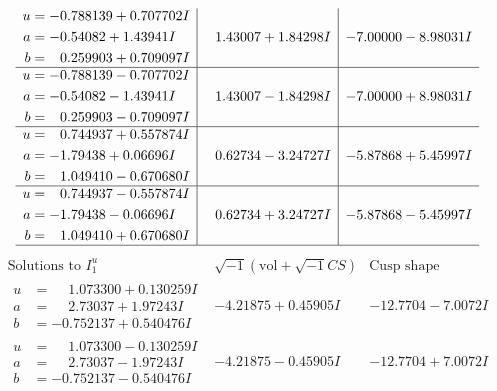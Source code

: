 \documentclass[1p]{elsarticle_modified}
\theoremstyle{definition}
\newcommand{\I}{\sqrt{-1}}
\begin{document}
$$\begin{array}{c|c|c}
\begin{aligned}
u &= -0.788139 + 0.707702 I \\
a &= -0.54082 + 1.43941 I \\
b &= \phantom{-}0.259903 + 0.709097 I\end{aligned}
 & \phantom{-}1.43007 + 1.84298 I & -7.00000 - 8.98031 I \\ \hline\begin{aligned}
u &= -0.788139 - 0.707702 I \\
a &= -0.54082 - 1.43941 I \\
b &= \phantom{-}0.259903 - 0.709097 I\end{aligned}
 & \phantom{-}1.43007 - 1.84298 I & -7.00000 + 8.98031 I \\ \hline\begin{aligned}
u &= \phantom{-}0.744937 + 0.557874 I \\
a &= -1.79438 + 0.06696 I \\
b &= \phantom{-}1.049410 - 0.670680 I\end{aligned}
 & \phantom{-}0.62734 - 3.24727 I & -5.87868 + 5.45997 I \\ \hline\begin{aligned}
u &= \phantom{-}0.744937 - 0.557874 I \\
a &= -1.79438 - 0.06696 I \\
b &= \phantom{-}1.049410 + 0.670680 I\end{aligned}
 & \phantom{-}0.62734 + 3.24727 I & -5.87868 - 5.45997 I\\
 \hline 
 \end{array}$$\newpage$$\begin{array}{c|c|c}  
\text{Solutions to }I^u_{1}& \I (\text{vol} + \sqrt{-1}CS) & \text{Cusp shape}\\
 \hline 
\begin{aligned}
u &= \phantom{-}1.073300 + 0.130259 I \\
a &= \phantom{-}2.73037 + 1.97243 I \\
b &= -0.752137 + 0.540476 I\end{aligned}
 & -4.21875 + 0.45905 I & -12.7704 - 7.0072 I \\ \hline\begin{aligned}
u &= \phantom{-}1.073300 - 0.130259 I \\
a &= \phantom{-}2.73037 - 1.97243 I \\
b &= -0.752137 - 0.540476 I\end{aligned}
 & -4.21875 - 0.45905 I & -12.7704 + 7.0072 I \\ \hline\begin{aligned}

\end{aligned}
\end{array}$$
\end{document}
